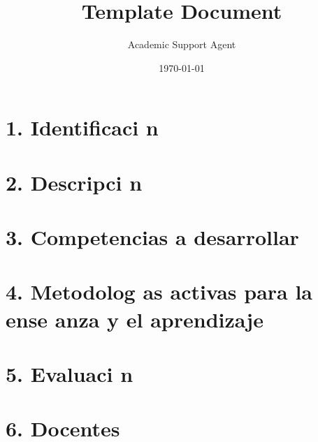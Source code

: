 \documentclass{article}
\title{Template Document}
\author{Academic Support Agent}
\date{\today}
\begin{document}
\maketitle


    \section*{1. Identificaci n}
    \identificacion


    \section*{2. Descripci n}
    \descripcion
    

    \section*{3. Competencias a desarrollar}



    \section*{4. Metodolog as activas para la ense anza y el aprendizaje}
    \metodologias


    \section*{5. Evaluaci n}
    \reglasEvaluacion


    
    \newpage
    \section*{6. Docentes}
    \listaDocentes
    
\end{document}

